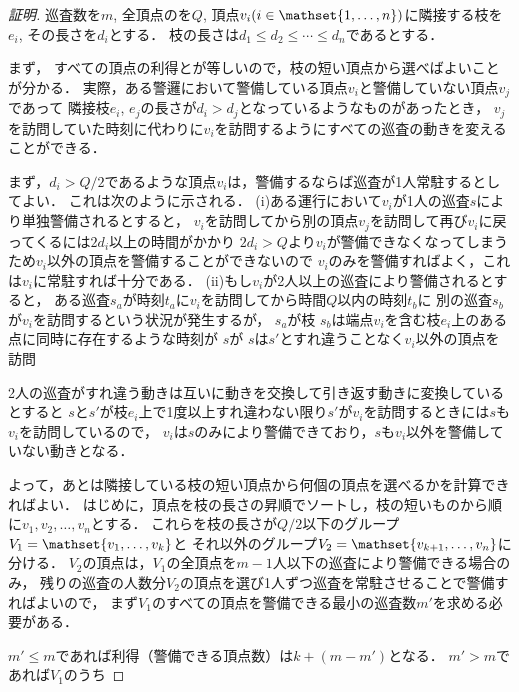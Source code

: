 \begin{proof}[証明]

    巡査数を$m$, 全頂点の{\timelimit}を$Q$, 
    頂点$v_i (i \in \mathset{1,\ldots, n})$に隣接する枝を$e_i$, その長さを$d_i$とする．
    枝の長さは$d_1 \leq d_2 \leq \cdots \leq d_n$であるとする．

    まず，
    すべての頂点の利得と{\timelimit}が等しいので，枝の短い頂点から選べばよいことが分かる．
    実際，ある警邏において警備している頂点$v_i$と警備していない頂点$v_j$であって
    隣接枝$e_i$, $e_j$の長さが$d_i > d_j$となっているようなものがあったとき，
    $v_j$を訪問していた時刻に代わりに$v_i$を訪問するようにすべての巡査の動きを変えることができる．




    まず，$d_i > Q/2$であるような頂点$v_i$は，警備するならば巡査が1人常駐するとしてよい．
    これは次のように示される．
    (i)ある運行において$v_i$が1人の巡査$s$により単独警備されるとすると，
    $v_i$を訪問してから別の頂点$v_j$を訪問して再び$v_i$に戻ってくるには$2d_i$以上の時間がかかり
    $2d_i > Q$より$v_i$が警備できなくなってしまうため$v_i$以外の頂点を警備することができないので
    $v_i$のみを警備すればよく，これは$v_i$に常駐すれば十分である．
    (ii)もし$v_i$が2人以上の巡査により警備されるとすると，
    ある巡査$s_a$が時刻$t_a$に$v_i$を訪問してから時間$Q$以内の時刻$t_b$に
    別の巡査$s_b$が$v_i$を訪問するという状況が発生するが，
    $s_a$が枝
    $s_b$は端点$v_i$を含む枝$e_i$上のある点に同時に存在するような時刻が
    $s$が
    $s$は$s'$とすれ違うことなく$v_i$以外の頂点を訪問



    2人の巡査がすれ違う動きは互いに動きを交換して引き返す動きに変換しているとすると
    $s$と$s'$が枝$e_i$上で1度以上すれ違わない限り$s'$が$v_i$を訪問するときには$s$も
    $v_i$を訪問しているので，
    $v_i$は$s$のみにより警備できており，$s$も$v_i$以外を警備していない動きとなる．



    よって，あとは隣接している枝の短い頂点から何個の頂点を選べるかを計算できればよい．
    はじめに，頂点を枝の長さの昇順でソートし，枝の短いものから順に$v_1,v_2, \ldots, v_n$とする．
    これらを枝の長さが$Q/2$以下のグループ$V_1 = \mathset{v_1, \ldots, v_k}$と
    それ以外のグループ$V_2 = \mathset{ v_{k + 1}, \ldots, v_n }$に分ける．
    $V_2$の頂点は，$V_1$の全頂点を$m - 1$人以下の巡査により警備できる場合のみ，
    残りの巡査の人数分$V_2$の頂点を選び1人ずつ巡査を常駐させることで警備すればよいので，
    まず$V_1$のすべての頂点を警備できる最小の巡査数$m'$を求める必要がある．

    $m' \leq m$であれば利得（警備できる頂点数）は$k + (m - m')$となる．
    $m' > m$であれば$V_1$のうち

\end{proof}

